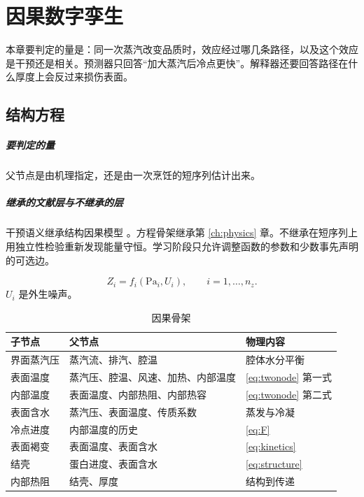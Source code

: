 \chapter{因果数字孪生}
\label{ch:causal}

本章要判定的量是：同一次蒸汽改变品质时，效应经过哪几条路径，以及这个效应是干预还是相关。预测器只回答“加大蒸汽后冷点更快”。解释器还要回答路径在什么厚度上会反过来损伤表面。

\section{结构方程}

\paragraph{要判定的量}
父节点是由机理指定，还是由一次烹饪的短序列估计出来。

\paragraph{继承的文献层与不继承的层}
干预语义继承结构因果模型 \cite{pearl2009}。方程骨架继承第 \ref{ch:physics} 章。不继承在短序列上用独立性检验重新发现能量守恒。学习阶段只允许调整函数的参数和少数事先声明的可选边。

\begin{equation}
\label{eq:scm}
Z_i=f_i(\mathrm{Pa}_i,U_i),\qquad i=1,\ldots,n_z.
\end{equation}
\(U_i\) 是外生噪声。

\begin{table}[ht]
\centering
\caption{因果骨架}
\begin{tabularx}{\textwidth}{llX}
\toprule
子节点 & 父节点 & 物理内容 \\
\midrule
界面蒸汽压 & 蒸汽流、排汽、腔温 & 腔体水分平衡 \\
表面温度 & 蒸汽压、腔温、风速、加热、内部温度 & \eqref{eq:twonode} 第一式 \\
内部温度 & 表面温度、内部热阻、内部热容 & \eqref{eq:twonode} 第二式 \\
表面含水 & 蒸汽压、表面温度、传质系数 & 蒸发与冷凝 \\
冷点进度 & 内部温度的历史 & \eqref{eq:F} \\
表面褐变 & 表面温度、表面含水 & \eqref{eq:kinetics} \\
结壳 & 蛋白进度、表面含水 & \eqref{eq:structure} \\
内部热阻 & 结壳、厚度 & 结构到传递 \\
\bottomrule
\end{tabularx}
\end{table}

